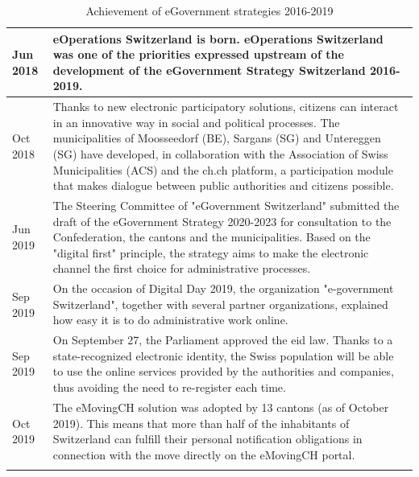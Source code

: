 \begin{longtable}[ c ]{| m{0.8cm} | m{13.5cm}|}
Jun 2018 & eOperations Switzerland is born. eOperations Switzerland was one of the priorities expressed upstream of the development of the eGovernment Strategy Switzerland 2016-2019.\\ \hline
Oct 2018 & Thanks to new electronic participatory solutions, citizens can interact in an innovative way in social and political processes. The municipalities of Moosseedorf (BE), Sargans (SG) and Untereggen (SG) have developed, in collaboration with the Association of Swiss Municipalities (ACS) and the ch.ch platform, a participation module that makes dialogue between public authorities and citizens possible.\\ \hline
Jun 2019 & The Steering Committee of "eGovernment Switzerland" submitted the draft of the eGovernment Strategy 2020-2023 for consultation to the Confederation, the cantons and the municipalities. Based on the "digital first" principle, the strategy aims to make the electronic channel the first choice for administrative processes. \\ \hline
Sep 2019 & On the occasion of Digital Day 2019, the organization "e-government Switzerland", together with several partner organizations, explained how easy it is to do administrative work online. \\ \hline
Sep 2019 &  On September 27, the Parliament approved the \acrshort{eid} law. Thanks to a state-recognized electronic identity, the Swiss population will be able to use the online services provided by the authorities and companies, thus avoiding the need to re-register each time.\\ \hline
Oct 2019 & The eMovingCH solution was adopted by 13 cantons (as of October 2019). This means that more than half of the inhabitants of Switzerland can fulfill their personal notification obligations in connection with the move directly on the eMovingCH portal.\\ \hline
 \caption{Achievement of eGovernment strategies 2016-2019 \cite{eGov2016Strat}}
 \label{tab:Achievement of eGovernment strategies 2016-2019}\\
\end{longtable}

